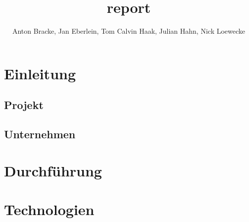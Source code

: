 \documentclass[10pt, a4paper]{article}
\title{report}
\author{Anton Bracke, Jan Eberlein, Tom Calvin Haak, Julian Hahn, Nick Loewecke}
\begin{document}
\section{Einleitung}
\subsection{Projekt}
\subsection{Unternehmen}

\section{Durchführung}

\section{Technologien}

 
\end{document}
